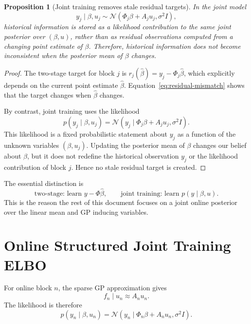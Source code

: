 \documentclass[12pt]{article}
\newtheorem{proposition}{Proposition}
\begin{document}
\begin{proposition}[Joint training removes stale residual targets]
In the joint model
\begin{equation}
y_j\mid \beta,u_j
\sim
\mathcal{N}(\Phi_j\beta+A_j u_j,\sigma^2I),
\end{equation}
historical information is stored as a likelihood contribution to the same joint posterior
over $(\beta,u)$, rather than as residual observations computed from a changing point
estimate of $\beta$. Therefore, historical information does not become inconsistent when
the posterior mean of $\beta$ changes.
\end{proposition}

\begin{proof}
The two-stage target for block $j$ is
$r_j(\hat{\beta})=y_j-\Phi_j\hat{\beta}$, which explicitly depends on the current point
estimate $\hat{\beta}$. Equation~\eqref{eq:residual-mismatch} shows that the target
changes when $\hat{\beta}$ changes.

By contrast, joint training uses the likelihood
\begin{equation}
p(y_j\mid \beta,u_j)
=
\mathcal{N}(y_j\mid \Phi_j\beta+A_j u_j,\sigma^2I).
\end{equation}
This likelihood is a fixed probabilistic statement about $y_j$ as a function of the
unknown variables $(\beta,u_j)$. Updating the posterior mean of $\beta$ changes our
belief about $\beta$, but it does not redefine the historical observation $y_j$ or the
likelihood contribution of block $j$. Hence no stale residual target is created.
\end{proof}

The essential distinction is
\begin{equation}
\text{two-stage: learn } y-\Phi\hat{\beta},
\qquad
\text{joint training: learn } p(y\mid \beta,u).
\end{equation}
This is the reason the rest of this document focuses on a joint online posterior over
the linear mean and GP inducing variables.


\section{Online Structured Joint Training ELBO}
\label{sec:online_structured_joint_elbo}

For online block $n$, the sparse GP approximation gives
\begin{equation}
    f_n\mid u_n \approx A_nu_n .
\end{equation}
The likelihood is therefore
\begin{equation}
    p(y_n\mid \beta,u_n)
    =
    \mathcal{N}
    \left(
        y_n\mid \Phi_n\beta+A_nu_n,\sigma^2I
    \right).
    \label{eq:joint-likelihood}
\end{equation}
\end{document}
